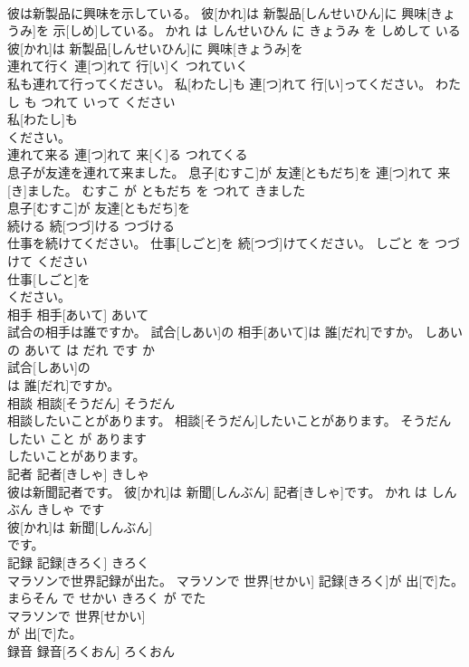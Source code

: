 \documentclass[8pt]{extreport}
\begin{document}
\begin{CJK}{UTF8}{min}
\\	彼は新製品に興味を示している。	彼[かれ]は 新製品[しんせいひん]に 興味[きょうみ]を 示[しめ]している。	かれ は しんせいひん に きょうみ を しめして いる	
\\	彼[かれ]は 新製品[しんせいひん]に 興味[きょうみ]を
\\	連れて行く	連[つ]れて 行[い]く	つれていく	
\\	私も連れて行ってください。	私[わたし]も 連[つ]れて 行[い]ってください。	わたし も つれて いって ください	
\\	私[わたし]も
\\	ください。			
\\	連れて来る	連[つ]れて 来[く]る	つれてくる	
\\	息子が友達を連れて来ました。	息子[むすこ]が 友達[ともだち]を 連[つ]れて 来[き]ました。	むすこ が ともだち を つれて きました	
\\	息子[むすこ]が 友達[ともだち]を
\\	続ける	続[つづ]ける	つづける	
\\	仕事を続けてください。	仕事[しごと]を 続[つづ]けてください。	しごと を つづけて ください	
\\	仕事[しごと]を
\\	ください。			
\\	相手	相手[あいて]	あいて	
\\	試合の相手は誰ですか。	試合[しあい]の 相手[あいて]は 誰[だれ]ですか。	しあい の あいて は だれ です か	
\\	試合[しあい]の
\\	は 誰[だれ]ですか。			
\\	相談	相談[そうだん]	そうだん	
\\	相談したいことがあります。	相談[そうだん]したいことがあります。	そうだん したい こと が あります	
\\	したいことがあります。			
\\	記者	記者[きしゃ]	きしゃ	
\\	彼は新聞記者です。	彼[かれ]は 新聞[しんぶん] 記者[きしゃ]です。	かれ は しんぶん きしゃ です	
\\	彼[かれ]は 新聞[しんぶん]
\\	です。			
\\	記録	記録[きろく]	きろく	
\\	マラソンで世界記録が出た。	マラソンで 世界[せかい] 記録[きろく]が 出[で]た。	まらそん で せかい きろく が でた	
\\	マラソンで 世界[せかい]
\\	が 出[で]た。			
\\	録音	録音[ろくおん]	ろくおん	

\end{CJK}
\end{document}
